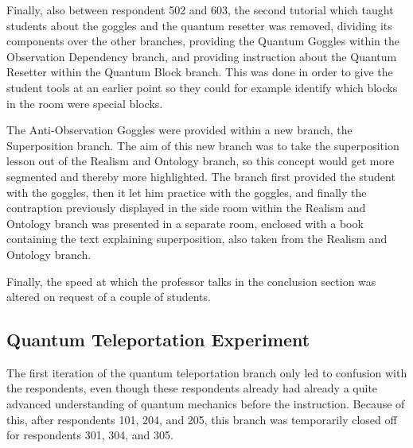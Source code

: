\documentclass[11pt,twoside]{report} %
\begin{document}
Finally, also between respondent 502 and 603, the second tutorial which taught students about the goggles and the quantum resetter was removed, dividing its components over the other branches, providing the Quantum Goggles within the Observation Dependency branch, and providing instruction about the Quantum Resetter within the Quantum Block branch. This was done in order to give the student  tools at an earlier point so they could for example identify which blocks in the room were special blocks.

The Anti-Observation Goggles were provided within a new branch, the Superposition branch. The aim of this new branch was to take the superposition lesson out of the Realism and Ontology branch, so this concept would get more segmented and thereby more highlighted. The branch first provided the student with the goggles, then it let him practice with the goggles, and finally the contraption previously displayed in the side room within the Realism and Ontology branch was presented in a separate room, enclosed with a book containing the text explaining superposition, also taken from the Realism and Ontology branch.

Finally, the speed at which the professor talks in the conclusion section was altered on request of a couple of students.

\subsection{Quantum Teleportation Experiment}

The first iteration of the quantum teleportation branch only led to confusion with the respondents, even though these respondents already had already a quite advanced understanding of quantum mechanics before the instruction. Because of this, after respondents 101, 204, and 205, this branch was temporarily closed off for respondents 301, 304, and 305.
\end{document}
